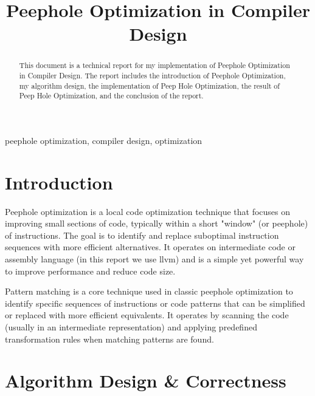 \documentclass[conference]{IEEEtran}
\begin{document}
\title{Peephole Optimization in Compiler Design\\}

\author{
}

\maketitle

\begin{abstract}
	This document is a technical report for my implementation of Peephole Optimization in Compiler Design. The report includes the introduction of Peephole Optimization, my algorithm design, the implementation of Peep Hole Optimization, the result of Peep Hole Optimization, and the conclusion of the report.
\end{abstract}

\begin{IEEEkeywords}
	peephole optimization, compiler design, optimization
\end{IEEEkeywords}

\section{Introduction}
Peephole optimization is a local code optimization technique that focuses on improving small sections of code, typically within a short "window" (or peephole) of instructions. The goal is to identify and replace suboptimal instruction sequences with more efficient alternatives. It operates on intermediate code or assembly language (in this report we use llvm) and is a simple yet powerful way to improve performance and reduce code size.

Pattern matching is a core technique used in classic peephole optimization to identify specific sequences of instructions or code patterns that can be simplified or replaced with more efficient equivalents. It operates by scanning the code (usually in an intermediate representation) and applying predefined transformation rules when matching patterns are found.

\section{Algorithm Design \& Correctness}
\label{sec:algo}
\end{document}
